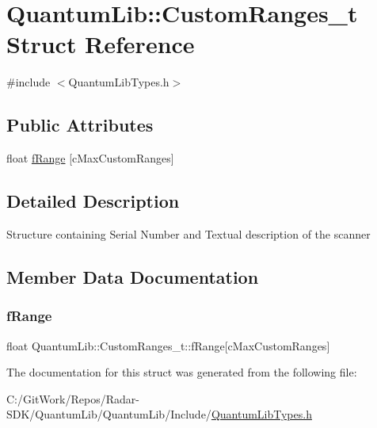 \hypertarget{struct_quantum_lib_1_1_custom_ranges__t}{}\section{Quantum\+Lib\+:\+:Custom\+Ranges\+\_\+t Struct Reference}
\label{struct_quantum_lib_1_1_custom_ranges__t}


{\ttfamily \#include $<$Quantum\+Lib\+Types.\+h$>$}

\subsection*{Public Attributes}
\begin{DoxyCompactItemize}
\item 
float \mbox{\hyperlink{struct_quantum_lib_1_1_custom_ranges__t_a33998c9d674be017d2bf9c224e26e90b}{f\+Range}} \mbox{[}c\+Max\+Custom\+Ranges\mbox{]}
\end{DoxyCompactItemize}


\subsection{Detailed Description}
Structure containing Serial Number and Textual description of the scanner 

\subsection{Member Data Documentation}
\mbox{\label{struct_quantum_lib_1_1_custom_ranges__t_a33998c9d674be017d2bf9c224e26e90b}} 
\subsubsection{\texorpdfstring{f\+Range}{fRange}}
{\footnotesize\ttfamily float Quantum\+Lib\+::\+Custom\+Ranges\+\_\+t\+::f\+Range\mbox{[}c\+Max\+Custom\+Ranges\mbox{]}}



The documentation for this struct was generated from the following file\+:\begin{DoxyCompactItemize}
\item 
C\+:/\+Git\+Work/\+Repos/\+Radar-\/\+S\+D\+K/\+Quantum\+Lib/\+Quantum\+Lib/\+Include/\mbox{\hyperlink{_quantum_lib_types_8h}{Quantum\+Lib\+Types.\+h}}\end{DoxyCompactItemize}
